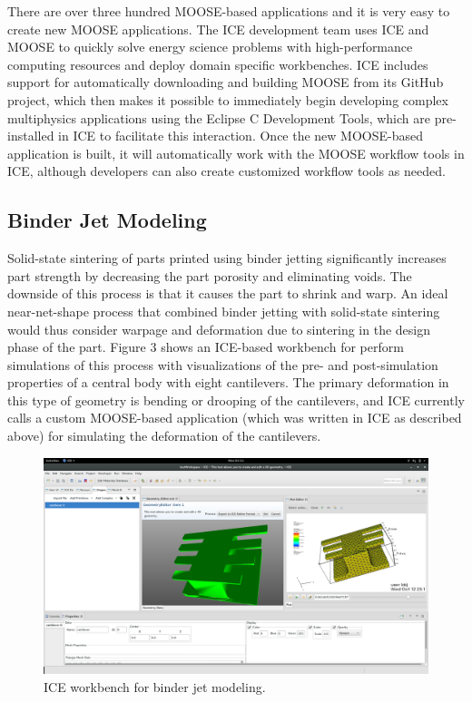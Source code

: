 There are over three hundred MOOSE-based applications and it is very
easy to create new MOOSE applications. The ICE development team uses ICE
and MOOSE to quickly solve energy science problems with high-performance
computing resources and deploy domain specific workbenches. ICE includes
support for automatically downloading and building MOOSE from its GitHub
project, which then makes it possible to immediately begin developing
complex multiphysics applications using the Eclipse C Development Tools,
which are pre-installed in ICE to facilitate this interaction. Once the
new MOOSE-based application is built, it will automatically work with
the MOOSE workflow tools in ICE, although developers can also create
customized workflow tools as needed.

\subsection{Binder Jet Modeling}\label{binder-jet-modeling}

Solid-state sintering of parts printed using binder jetting
significantly increases part strength by decreasing the part porosity
and eliminating voids. The downside of this process is that it causes
the part to shrink and warp. An ideal near-net-shape process that
combined binder jetting with solid-state sintering would thus consider
warpage and deformation due to sintering in the design phase of the
part. Figure 3 shows an ICE-based workbench for perform simulations of
this process with visualizations of the pre- and post-simulation
properties of a central body with eight cantilevers. The primary
deformation in this type of geometry is bending or drooping of the
cantilevers, and ICE currently calls a custom MOOSE-based application
(which was written in ICE as described above) for simulating the
deformation of the cantilevers.

\begin{figure}[htbp]
\centering
\includegraphics[width=\textwidth]{images/ice-bjm.png}
\caption{ICE workbench for binder jet modeling.}
\end{figure}

